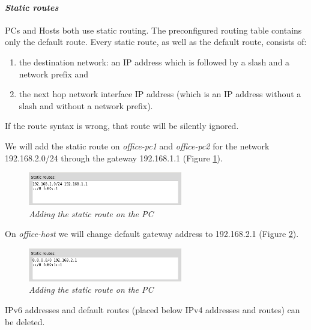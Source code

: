 \paragraph{\emph{Static routes}} \hfill

PCs and Hosts both use static routing. The preconfigured routing table contains
only the default route. Every static route, as well as the default route,
consists of:
\begin{enumerate}
  \item the destination network: an IP address which is followed by a slash and
a network prefix and
  \item the next hop network interface IP address (which is an IP address
without a slash and without a network prefix).
\end{enumerate}

If the route syntax is wrong, that route will be silently ignored. 

We will add the static route on \emph{office-pc1} and \emph{office-pc2} for the
network 192.168.2.0/24 through the gateway 192.168.1.1 (Figure
\ref{fig:pc_config_staticroutes}). 

\begin{figure}[H]
\centering
\vspace{10pt}
\includegraphics[width=0.6\textwidth]{./images/pc_config_staticroutes.png}
\caption{\emph{Adding the static route on the PC}}
\label{fig:pc_config_staticroutes}
\end{figure}

On \emph{office-host} we will change default gateway address to 192.168.2.1
(Figure \ref{fig:host_config_staticroutes}).

\begin{figure}[H]
\centering
\vspace{10pt}
\includegraphics[width=0.6\textwidth]{./images/host_config_staticroutes.png}
\caption{\emph{Adding the static route on the PC}}
\label{fig:host_config_staticroutes}
\end{figure}

IPv6 addresses and default routes (placed below IPv4 addresses and routes) can
be deleted.

